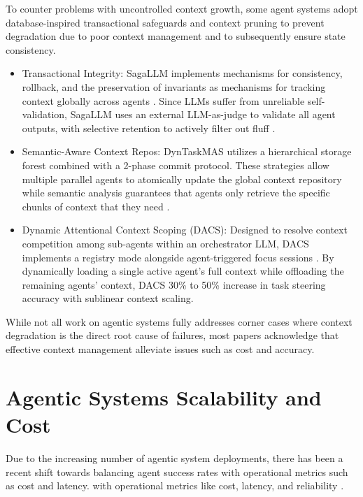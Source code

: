 \documentclass[conference]{IEEEtran}
\begin{document}
To counter problems with uncontrolled context growth, some agent systems adopt
database-inspired transactional safeguards and context pruning to prevent degradation due to poor context
management and to subsequently ensure state consistency.
\begin{itemize}
\item Transactional Integrity: SagaLLM implements mechanisms for consistency, 
	rollback, and the preservation of invariants as mechanisms for tracking context globally
	across agents \cite{chang_sagallm_2025}. 
	Since LLMs suffer from unreliable self-validation, SagaLLM uses an external
	LLM-as-judge to validate all agent outputs,
	with selective retention to actively filter out fluff \cite{chang_sagallm_2025}.
\item Semantic-Aware Context Repos: DynTaskMAS utilizes a hierarchical storage forest combined 
	with a 2-phase commit protocol. 
	These strategies allow multiple parallel agents to atomically update the global context repository 
	while semantic analysis guarantees that agents only retrieve the specific chunks 
	of context that they need \cite{yu_dyntaskmas_2025}.
\item Dynamic Attentional Context Scoping (DACS): Designed to resolve context competition among
	sub-agents within an orchestrator LLM, DACS implements a registry mode alongside agent-triggered
	focus sessions \cite{patel_dynamic_2026}. 
	By dynamically loading a single active agent's full context while offloading the remaining
	agents' context, DACS 30\% to 50\% increase in task steering accuracy with sublinear context scaling.
\end{itemize}
While not all work on agentic systems fully addresses corner cases where context degradation is the
direct root cause of failures, most papers acknowledge that effective context management alleviate
issues such as cost and accuracy.

\section{Agentic Systems Scalability and Cost}
Due to the increasing number of agentic system deployments, there has been a recent shift
towards balancing agent success rates with operational metrics such as cost and latency.
with operational metrics like cost, latency, and reliability \cite{ding_hybrid_2024, mehta_beyond_2025}. 
\end{document}
